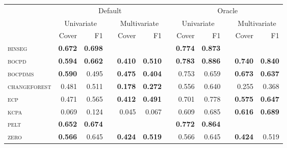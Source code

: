 \begin{tabular}{lrrcrrcrrcrr}
\toprule
 & \multicolumn{5}{c}{Default} &  & \multicolumn{5}{c}{Oracle} \\
\cmidrule(lr){2-6} \cmidrule(lr){8-12}
 & \multicolumn{2}{c}{Univariate} &  & \multicolumn{2}{c}{Multivariate} &  & \multicolumn{2}{c}{Univariate} &  & \multicolumn{2}{c}{Multivariate} \\
\cmidrule(lr){2-3} \cmidrule(lr){5-6} \cmidrule(lr){8-9} \cmidrule(lr){11-12}
 & Cover & F1 & & Cover & F1 & & Cover & F1 & & Cover & F1\\
\midrule
\textsc{binseg}       & \textbf{0.672} & \textbf{0.698} &  &                &                &  & \textbf{0.774} & \textbf{0.873} &  &                &                \\
\textsc{bocpd}        & \textbf{0.594} & \textbf{0.662} &  & \textbf{0.410} & \textbf{0.510} &  & \textbf{0.783} & \textbf{0.886} &  & \textbf{0.740} & \textbf{0.840} \\
\textsc{bocpdms}      & \textbf{0.590} & 0.495          &  & \textbf{0.475} & \textbf{0.404} &  & 0.753          & 0.659          &  & \textbf{0.673} & \textbf{0.637} \\
\textsc{changeforest} & 0.481          & 0.511          &  & \textbf{0.178} & \textbf{0.272} &  & 0.556          & 0.640          &  & 0.255          & 0.368          \\
\textsc{ecp}          & 0.471          & 0.565          &  & \textbf{0.412} & \textbf{0.491} &  & 0.701          & 0.778          &  & \textbf{0.575} & \textbf{0.647} \\
\textsc{kcpa}         & 0.069          & 0.124          &  & 0.045          & 0.067          &  & 0.609          & 0.685          &  & \textbf{0.616} & \textbf{0.689} \\
\textsc{pelt}         & \textbf{0.652} & \textbf{0.674} &  &                &                &  & \textbf{0.772} & \textbf{0.864} &  &                &                \\
\textsc{zero}         & \textbf{0.566} & 0.645          &  & \textbf{0.424} & \textbf{0.519} &  & 0.566          & 0.645          &  & \textbf{0.424} & 0.519          \\
\bottomrule
\end{tabular}